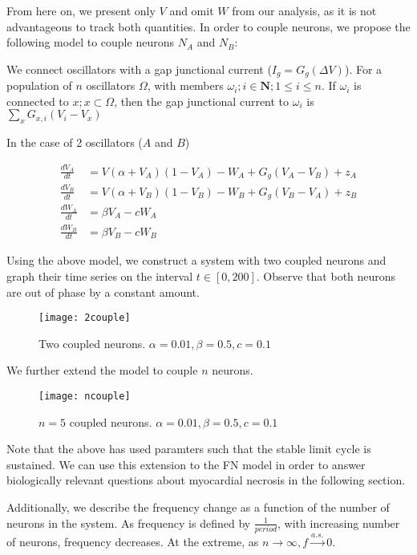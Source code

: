 \documentclass[11pt]{report}
\begin{document}
From here on, we present only $V$ and omit $W$ from our analysis, as it is not advantageous to track both quantities. In order to couple neurons, we propose the following model to couple neurons $N_A$ and $N_B$:


We connect oscillators with a gap junctional current ($I_g = G_g(\Delta V)$). For a population of $n$ oscillators $\Omega$, with members $\omega_i; i\in \textbf{N}; 1\leq i\leq n$. If $\omega_i$ is connected to $x; x\subset\Omega$, then the gap junctional current to $\omega_i$ is $\sum_{x} G_{x,i}(V_i-V_x)$

In the case of 2 oscillators ($A$ and $B$)

$$ \begin{aligned} \frac{dV_A}{dt} &= V(\alpha +V_A)(1-V_A) -W_A + G_g(V_A-V_B) + z_A\\ \frac{dV_B}{dt} &= V(\alpha +V_B)(1-V_B) -W_B + G_g(V_B-V_A) +z_B\\ \frac{dW_A}{dt} &= \beta V_A - cW_A\\ \frac{dW_B}{dt} &= \beta V_B - cW_B
\end{aligned} $$

Using the above model, we construct a system with two coupled neurons and graph their time series on the interval $t \in [0,200]$. Observe that both neurons are out of phase by a constant amount.


\begin{figure}[!ht]
  \caption{Two coupled neurons. $\alpha = 0.01, \beta = 0.5,c = 0.1$}
  \centering
    \texttt{[image: 2couple]}
\end{figure}

We further extend the model to couple $n$ neurons. 

\begin{figure}[!ht]
  \caption{$n=5$ coupled neurons. $\alpha = 0.01, \beta = 0.5,c = 0.1$ }
  \centering
    \texttt{[image: ncouple]}
\end{figure}

Note that the above has used paramters such that the stable limit cycle is sustained. We can use this extension to the FN model in order to answer biologically relevant questions about myocardial necrosis in the following section. 


Additionally, we describe the frequency change as a function of the number of neurons in the system. As frequency is defined by $\frac{1}{period}$, with increasing number of neurons, frequency decreases. At the extreme, as $n \rightarrow \infty, f \overset{a.s.}{\rightarrow} 0$.
\end{document}
